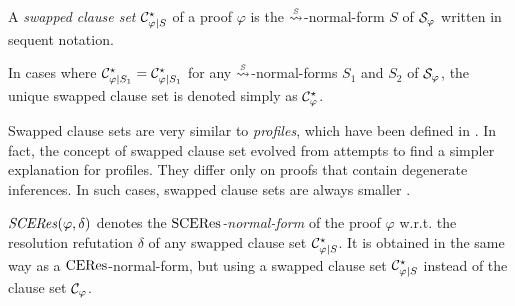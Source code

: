 \begin{definition}
\label{definition:CutPertinentClauseSetSwap}
A \emph{swapped clause set} $\mathcal{C}^{\star}_{\varphi|S}$ of a proof $\varphi$ is the $\normalizePlusTimesS$-normal-form $S$ of $\mathcal{S}_{\varphi}$ written in sequent notation.
\end{definition}

\begin{remark}
In cases where $\mathcal{C}^{\star}_{\varphi|S_1} = \mathcal{C}^{\star}_{\varphi|S_1}$ for any $\normalizePlusTimesS$-normal-forms $S_1$ and $S_2$ of $\mathcal{S}_{\varphi}$, the unique swapped clause set is denoted simply as $\mathcal{C}^{\star}_{\varphi}$.
\end{remark}


\begin{remark}
Swapped clause sets are very similar to \emph{profiles}, which have been defined in \cite{Hetzl2007CharacteristicClauseSetsandProofTransformations}. In fact, the concept of swapped clause set evolved from attempts to find a simpler explanation for profiles. They differ only on proofs that contain  degenerate inferences. In such cases, swapped clause sets are always smaller \cite{Woltzenlogel-Paleo2009A-General-Analysis-of-Cut-Elimination-by-CERes}.
\end{remark}


\begin{definition}
$\mathit{SCERes}(\varphi,\delta)$ denotes the \emph{$\mathrm{SCERes}$-normal-form} of the proof $\varphi$ w.r.t. the resolution refutation $\delta$ of any swapped clause set $\mathcal{C}^{\star}_{\varphi|S}$. It is obtained in the same way as a $\mathrm{CERes}$-normal-form, but using a swapped clause set $\mathcal{C}^{\star}_{\varphi|S}$ instead of the clause set $\mathcal{C}_{\varphi}$.
\end{definition}



